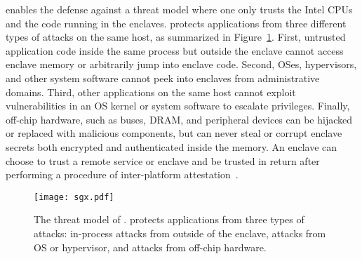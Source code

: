 
\sgx{} enables the defense against a threat model where one only trusts the Intel CPUs and the 
code running in the enclaves.
\sgx{} protects applications from three different types of attacks on the same host, as summarized in Figure~\ref{fig:sgx:threats}. First, untrusted application code inside the same process but outside the enclave
cannot access enclave memory or arbitrarily jump into enclave code. Second, OSes, hypervisors, and other system software cannot peek into enclaves from administrative domains.
Third, other applications on the same host
cannot exploit vulnerabilities in an OS kernel or system software
to escalate privileges.
Finally, off-chip hardware, such as buses, DRAM, and peripheral devices can be hijacked or replaced with malicious components, but can never steal or corrupt enclave secrets
both encrypted and authenticated inside the memory. 
An \sgx{} enclave can choose to trust a remote service or enclave and be trusted in return
after performing a procedure of inter-platform attestation~\cite{sgx-attestation}.


\begin{figure}[t!]
\centering
\texttt{[image: sgx.pdf]}
\caption{The threat model of \sgx{}. \sgx{} protects applications
from three types of attacks:
in-process attacks from outside of the enclave,
attacks from OS or hypervisor, and attacks from off-chip hardware.}
\label{fig:sgx:threats}
\end{figure}



